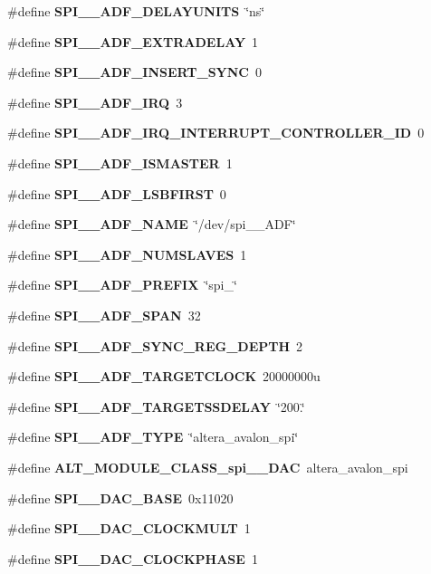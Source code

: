 \begin{DoxyCompactItemize}
\#define {\bf S\+P\+I\+\_\+\_\+\+A\+D\+F\+\_\+\+D\+E\+L\+A\+Y\+U\+N\+I\+TS}~\char`\"{}ns\char`\"{}
\item 
\#define {\bf S\+P\+I\+\_\+\_\+\+A\+D\+F\+\_\+\+E\+X\+T\+R\+A\+D\+E\+L\+AY}~1
\item 
\#define {\bf S\+P\+I\+\_\+\_\+\+A\+D\+F\+\_\+\+I\+N\+S\+E\+R\+T\+\_\+\+S\+Y\+NC}~0
\item 
\#define {\bf S\+P\+I\+\_\+\_\+\+A\+D\+F\+\_\+\+I\+RQ}~3
\item 
\#define {\bf S\+P\+I\+\_\+\_\+\+A\+D\+F\+\_\+\+I\+R\+Q\+\_\+\+I\+N\+T\+E\+R\+R\+U\+P\+T\+\_\+\+C\+O\+N\+T\+R\+O\+L\+L\+E\+R\+\_\+\+ID}~0
\item 
\#define {\bf S\+P\+I\+\_\+\_\+\+A\+D\+F\+\_\+\+I\+S\+M\+A\+S\+T\+ER}~1
\item 
\#define {\bf S\+P\+I\+\_\+\_\+\+A\+D\+F\+\_\+\+L\+S\+B\+F\+I\+R\+ST}~0
\item 
\#define {\bf S\+P\+I\+\_\+\_\+\+A\+D\+F\+\_\+\+N\+A\+ME}~\char`\"{}/dev/spi\+\_\+\_\+\+A\+DF\char`\"{}
\item 
\#define {\bf S\+P\+I\+\_\+\_\+\+A\+D\+F\+\_\+\+N\+U\+M\+S\+L\+A\+V\+ES}~1
\item 
\#define {\bf S\+P\+I\+\_\+\_\+\+A\+D\+F\+\_\+\+P\+R\+E\+F\+IX}~\char`\"{}spi\+\_\+\char`\"{}
\item 
\#define {\bf S\+P\+I\+\_\+\_\+\+A\+D\+F\+\_\+\+S\+P\+AN}~32
\item 
\#define {\bf S\+P\+I\+\_\+\_\+\+A\+D\+F\+\_\+\+S\+Y\+N\+C\+\_\+\+R\+E\+G\+\_\+\+D\+E\+P\+TH}~2
\item 
\#define {\bf S\+P\+I\+\_\+\_\+\+A\+D\+F\+\_\+\+T\+A\+R\+G\+E\+T\+C\+L\+O\+CK}~20000000u
\item 
\#define {\bf S\+P\+I\+\_\+\_\+\+A\+D\+F\+\_\+\+T\+A\+R\+G\+E\+T\+S\+S\+D\+E\+L\+AY}~\char`\"{}200.\char`\"{}
\item 
\#define {\bf S\+P\+I\+\_\+\_\+\+A\+D\+F\+\_\+\+T\+Y\+PE}~\char`\"{}altera\+\_\+avalon\+\_\+spi\char`\"{}
\item 
\#define {\bf A\+L\+T\+\_\+\+M\+O\+D\+U\+L\+E\+\_\+\+C\+L\+A\+S\+S\+\_\+spi\+\_\+\_\+\+D\+AC}~altera\+\_\+avalon\+\_\+spi
\item 
\#define {\bf S\+P\+I\+\_\+\_\+\+D\+A\+C\+\_\+\+B\+A\+SE}~0x11020
\item 
\#define {\bf S\+P\+I\+\_\+\_\+\+D\+A\+C\+\_\+\+C\+L\+O\+C\+K\+M\+U\+LT}~1
\item 
\#define {\bf S\+P\+I\+\_\+\_\+\+D\+A\+C\+\_\+\+C\+L\+O\+C\+K\+P\+H\+A\+SE}~1
\item 

\end{DoxyCompactItemize}
